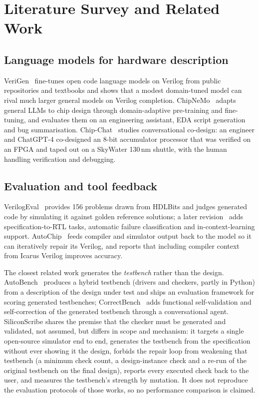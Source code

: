 \chapter{Literature Survey and Related Work}
\label{sec:related}

\section{Language models for hardware description}
VeriGen~\cite{verigen} fine-tunes open code language models on Verilog from public repositories and textbooks and shows that a modest domain-tuned model can rival much larger general models on Verilog completion. ChipNeMo~\cite{chipnemo} adapts general LLMs to chip design through domain-adaptive pre-training and fine-tuning, and evaluates them on an engineering assistant, EDA script generation and bug summarisation. Chip-Chat~\cite{chipchat} studies conversational co-design: an engineer and ChatGPT-4 co-designed an 8-bit accumulator processor that was verified on an FPGA and taped out on a SkyWater 130\,nm shuttle, with the human handling verification and debugging.

\section{Evaluation and tool feedback}
VerilogEval~\cite{verilogeval} provides 156 problems drawn from HDLBits and judges generated code by simulating it against golden reference solutions; a later revision~\cite{verilogeval2} adds specification-to-RTL tasks, automatic failure classification and in-context-learning support. AutoChip~\cite{autochip} feeds compiler and simulator output back to the model so it can iteratively repair its Verilog, and reports that including compiler context from Icarus Verilog improves accuracy.

The closest related work generates the \emph{testbench} rather than the design. AutoBench~\cite{autobench} produces a hybrid testbench (drivers and checkers, partly in Python) from a description of the design under test and ships an evaluation framework for scoring generated testbenches; CorrectBench~\cite{correctbench} adds functional self-validation and self-correction of the generated testbench through a conversational agent. SiliconScribe shares the premise that the checker must be generated and validated, not assumed, but differs in scope and mechanism: it targets a single open-source simulator end to end, generates the testbench from the specification without ever showing it the design, forbids the repair loop from weakening that testbench (a minimum check count, a design-instance check and a re-run of the original testbench on the final design), reports every executed check back to the user, and measures the testbench's strength by mutation. It does not reproduce the evaluation protocols of those works, so no performance comparison is claimed.

